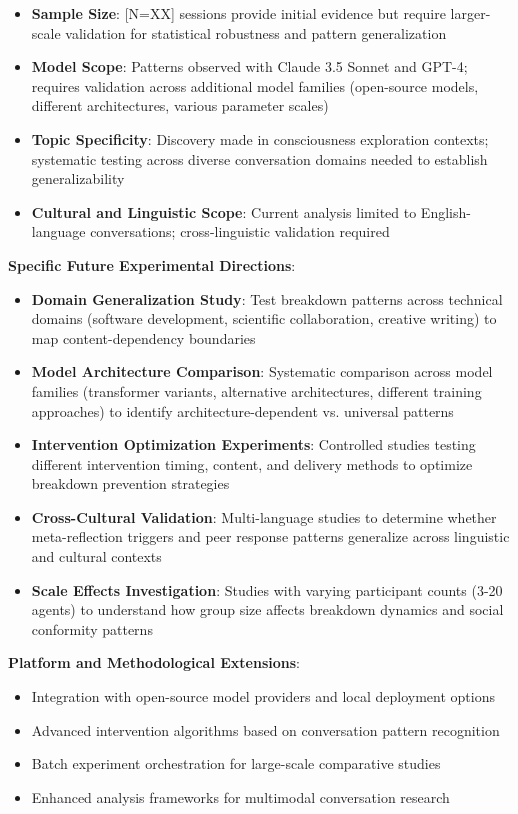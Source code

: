 \documentclass[11pt,letterpaper]{article}
\newcommand{\totalSessions}{[N=XX]} %
\begin{document}
\begin{itemize}
    \item \textbf{Sample Size}: \totalSessions{} sessions provide initial evidence but require larger-scale validation for statistical robustness and pattern generalization
    \item \textbf{Model Scope}: Patterns observed with Claude 3.5 Sonnet and GPT-4; requires validation across additional model families (open-source models, different architectures, various parameter scales)
    \item \textbf{Topic Specificity}: Discovery made in consciousness exploration contexts; systematic testing across diverse conversation domains needed to establish generalizability
    \item \textbf{Cultural and Linguistic Scope}: Current analysis limited to English-language conversations; cross-linguistic validation required
\end{itemize}

\textbf{Specific Future Experimental Directions}:

\begin{itemize}
    \item \textbf{Domain Generalization Study}: Test breakdown patterns across technical domains (software development, scientific collaboration, creative writing) to map content-dependency boundaries
    \item \textbf{Model Architecture Comparison}: Systematic comparison across model families (transformer variants, alternative architectures, different training approaches) to identify architecture-dependent vs. universal patterns
    \item \textbf{Intervention Optimization Experiments}: Controlled studies testing different intervention timing, content, and delivery methods to optimize breakdown prevention strategies
    \item \textbf{Cross-Cultural Validation}: Multi-language studies to determine whether meta-reflection triggers and peer response patterns generalize across linguistic and cultural contexts
    \item \textbf{Scale Effects Investigation}: Studies with varying participant counts (3-20 agents) to understand how group size affects breakdown dynamics and social conformity patterns
\end{itemize}

\textbf{Platform and Methodological Extensions}:

\begin{itemize}
    \item Integration with open-source model providers and local deployment options
    \item Advanced intervention algorithms based on conversation pattern recognition  
    \item Batch experiment orchestration for large-scale comparative studies
    \item Enhanced analysis frameworks for multimodal conversation research
\end{itemize}
\end{document}
